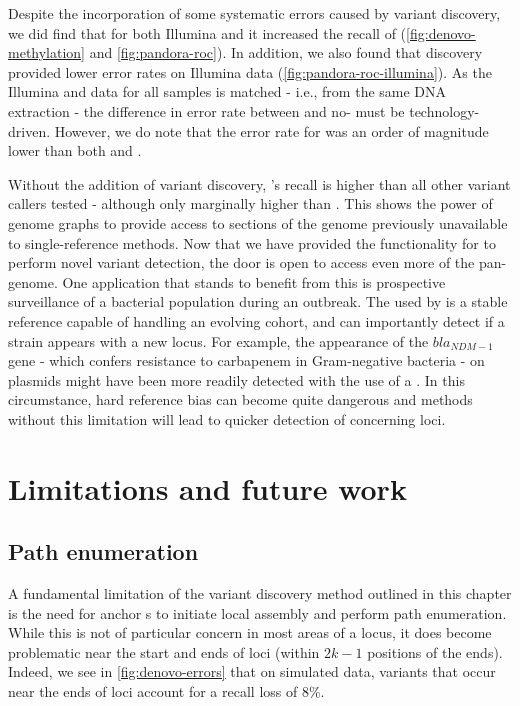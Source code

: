 Despite the incorporation of some \ont{} systematic errors caused by \denovo{} variant discovery, we did find that for both Illumina and \ont{} it increased the recall of \pandora{} (\autoref{fig:denovo-methylation} and \autoref{fig:pandora-roc}). In addition, we also found that \denovo{} discovery provided lower error rates on Illumina data (\autoref{fig:pandora-roc-illumina}). As the Illumina and \ont{} data for all samples is matched - i.e., from the same DNA extraction - the difference in error rate between \denovo{} and no-\denovo{} must be technology-driven. However, we do note that the \pandora{} error rate for \ont{} was an order of magnitude lower than both  and .

Without the addition of \denovo{} variant discovery, \pandora{}'s recall is higher than all other variant callers tested - although only marginally higher than . This shows the power of genome graphs to provide access to sections of the genome previously unavailable to single-reference methods. Now that we have provided the functionality for \pandora{} to perform novel variant detection, the door is open to access even more of the pan-genome. One application that stands to benefit from this is prospective surveillance of a bacterial population during an outbreak. The \panrg{} used by \pandora{} is a stable reference capable of handling an evolving cohort, and can importantly detect if a strain appears with a new locus. For example, the appearance of the $bla_{NDM-1}$ gene - which confers resistance to carbapenem in Gram-negative bacteria - on plasmids \cite{Yong2009,Kumarasamy2010} might have been more readily detected with the use of a \panrg{}. In this circumstance, hard reference bias can become quite dangerous and methods without this limitation will lead to quicker detection of concerning loci.

\section{Limitations and future work}
\label{sec:denovo-limits}

\subsection{Path enumeration}

A fundamental limitation of the \denovo{} variant discovery method outlined in this chapter is the need for anchor \kmer{}s to initiate local assembly and perform path enumeration. While this is not of particular concern in most areas of a locus, it does become problematic near the start and ends of loci (within $2k-1$ positions of the ends). Indeed, we see in \autoref{fig:denovo-errors} that on simulated data, variants that occur near the ends of loci account for a recall loss of 8\%.

